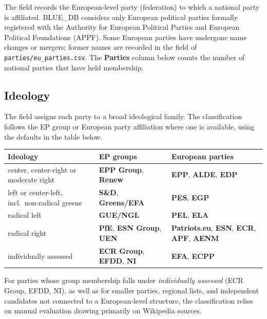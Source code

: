The  field records the European-level party (federation) to
which a national party is affiliated.  BLUE\_DB considers only European
political parties formally registered with the Authority for European
Political Parties and European Political Foundations (APPF).  Some European
parties have undergone name changes or mergers; former names are recorded in
the  field of \texttt{parties/eu\_parties.csv}.
The \textbf{Parties} column below counts the number of national parties that
have held membership.


\subsection{Ideology}

The  field assigns each party to a broad ideological family.
The classification follows the EP group or European party affiliation where
one is available, using the defaults in the table below.

\begin{longtable}{p{6.5cm}p{4cm}p{4cm}}
\toprule
\textbf{Ideology} & \textbf{EP groups} & \textbf{European parties} \\
\midrule
\endhead
\bottomrule
\endlastfoot
center, center-right or moderate right
  & \textbf{EPP Group}, \textbf{Renew}
  & \textbf{EPP}, \textbf{ALDE}, \textbf{EDP} \\
left or center-left, incl.\ non-radical greens
  & \textbf{S\&D}, \textbf{Greens/EFA}
  & \textbf{PES}, \textbf{EGP} \\
radical left
  & \textbf{GUE/NGL}
  & \textbf{PEL}, \textbf{ELA} \\
radical right
  & \textbf{PfE}, \textbf{ESN Group}, \textbf{UEN}
  & \textbf{Patriots.eu}, \textbf{ESN}, \textbf{ECR}, \textbf{APF}, \textbf{AENM} \\
individually assessed
  & \textbf{ECR Group}, \textbf{EFDD}, \textbf{NI}
  & \textbf{EFA}, \textbf{ECPP} \\
\end{longtable}
For parties whose group membership falls under \emph{individually assessed} (ECR Group,
EFDD, NI), as well as for smaller parties, regional lists, and independent
candidates not connected to a European-level structure, the classification
relies on manual evaluation drawing primarily on Wikipedia sources.


